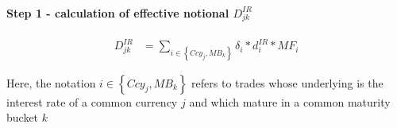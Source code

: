 \hypertarget{step-1---calculation-of-effective-notional-d_jkir}{%
\paragraph{\texorpdfstring{Step 1 - calculation of effective notional
\(D_{jk}^{IR}\)}{Step 1 - calculation of effective notional D\_\{jk\}\^{}\{IR\}}}\label{step-1---calculation-of-effective-notional-d_jkir}}

\begin{align*}
D_{jk}^{IR} &= \sum_{i\in\left\{Ccy_j, MB_k\right\}}{\delta_i*d_i^{IR}*MF_i}
\end{align*}

Here, the notation \(i\in\left\{Ccy_j, MB_k\right\}\) refers to trades
whose underlying is the interest rate of a common currency \(j\) and
which mature in a common maturity bucket \(k\)

